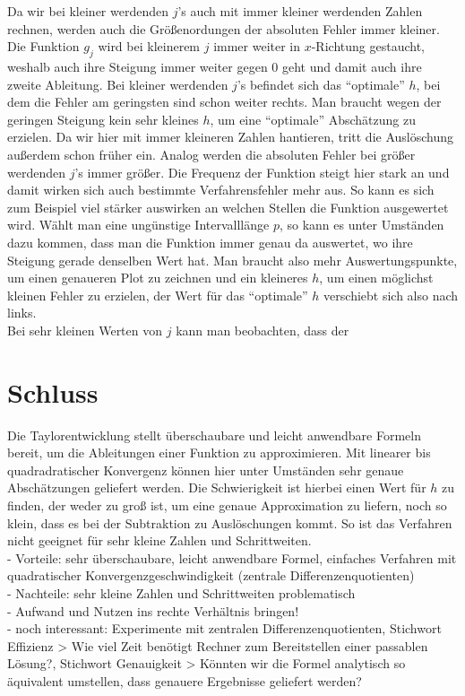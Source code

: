 \documentclass{scrartcl}
\begin{document}
Da wir bei kleiner werdenden $j$'s auch mit immer kleiner werdenden Zahlen rechnen, werden auch die Größenordungen der absoluten Fehler immer kleiner.
Die Funktion $g_j$ wird bei kleinerem $j$ immer weiter in $x$-Richtung gestaucht, weshalb auch ihre Steigung immer weiter gegen $0$ geht und damit auch ihre zweite Ableitung.
Bei kleiner werdenden $j$'s befindet sich das "`optimale"' $h$, bei dem die Fehler am geringsten sind schon weiter rechts. Man braucht wegen der geringen Steigung kein sehr kleines $h$, um eine "`optimale"' Abschätzung zu erzielen. Da wir hier mit immer kleineren Zahlen hantieren, tritt die Auslöschung außerdem schon früher ein.
Analog werden die absoluten Fehler bei größer werdenden $j$'s immer größer.
Die Frequenz der Funktion steigt hier stark an und damit wirken sich auch bestimmte Verfahrensfehler mehr aus. So kann es sich zum Beispiel viel stärker auswirken an welchen Stellen die Funktion ausgewertet wird. Wählt man eine ungünstige Intervalllänge $p$, so kann es unter Umständen dazu kommen, dass man die Funktion immer genau da auswertet, wo ihre Steigung gerade denselben Wert hat.
Man braucht also mehr Auswertungspunkte, um einen genaueren Plot zu zeichnen und ein kleineres $h$, um einen möglichst kleinen Fehler zu erzielen, der Wert für das "`optimale"' $h$ verschiebt sich also nach links.\\
Bei sehr kleinen Werten von $j$ kann man beobachten, dass der

\pagebreak \section{Schluss}
\label{sec:schluss}
Die Taylorentwicklung stellt überschaubare und leicht anwendbare Formeln bereit, um die Ableitungen einer Funktion zu approximieren.
Mit linearer bis quadradratischer Konvergenz können hier unter Umständen sehr genaue Abschätzungen geliefert werden.
Die Schwierigkeit ist hierbei einen Wert für $h$ zu finden, der weder zu groß ist, um eine genaue Approximation zu liefern, noch so klein, dass es bei der Subtraktion zu Auslöschungen kommt.
So ist das Verfahren nicht geeignet für sehr kleine Zahlen und Schrittweiten.\\

- Vorteile: sehr überschaubare, leicht anwendbare Formel, einfaches Verfahren mit
quadratischer Konvergenzgeschwindigkeit (zentrale Differenzenquotienten) \\
- Nachteile: sehr kleine Zahlen und Schrittweiten problematisch \\
- Aufwand und Nutzen ins rechte Verhältnis bringen! \\
- noch interessant: Experimente mit zentralen Differenzenquotienten, Stichwort
Effizienz > Wie viel Zeit benötigt Rechner zum Bereitstellen einer passablen Lösung?,
Stichwort Genauigkeit > Könnten wir die Formel analytisch so äquivalent umstellen,
dass genauere Ergebnisse geliefert werden? \\



\end{document}
